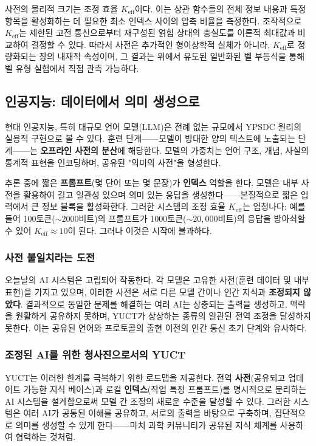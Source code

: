 \documentclass[12pt,a4paper]{article}
\newcommand{\Keff}{K_{\mathrm{eff}}}
\begin{document}
	사전의 물리적 크기는 조정 효율 $K_{\mathrm{eff}}$이다. 이는 상관 함수들의 전체 정보 내용과 특정 항목을 활성화하는 데 필요한 최소 인덱스 사이의 압축 비율을 측정한다. 조작적으로 $K_{\mathrm{eff}}$는 제한된 고전 통신으로부터 재구성된 얽힘 상태의 충실도를 이론적 최대값과 비교하여 결정할 수 있다. 따라서 사전은 추가적인 형이상학적 실체가 아니라, $K_{\mathrm{eff}}$로 정량화되는 장의 내재적 속성이며, 그 결과는 위에서 유도된 일반화된 벨 부등식을 통해 벨 유형 실험에서 직접 관측 가능하다.
	
	\subsection{인공지능: 데이터에서 의미 생성으로}
	
	현대 인공지능, 특히 대규모 언어 모델(LLM)은 전례 없는 규모에서 YPSDC 원리의 실용적 구현으로 볼 수 있다. 훈련 단계——모델이 방대한 양의 텍스트에 노출되는 단계——는 \textbf{오프라인 사전의 분산}에 해당한다. 모델의 가중치는 언어 구조, 개념, 사실의 통계적 표현을 인코딩하며, 공유된 "의미의 사전"을 형성한다.
	
	추론 중에 짧은 \textbf{프롬프트}(몇 단어 또는 몇 문장)가 \textbf{인덱스} 역할을 한다. 모델은 내부 사전을 활용하여 길고 일관성 있으며 의미 있는 응답을 생성한다——본질적으로 짧은 입력에서 큰 정보 블록을 활성화한다. 그러한 시스템의 조정 효율 $\Keff$는 엄청나다: 예를 들어 100토큰($\sim 2000$비트)의 프롬프트가 1000토큰($\sim 20,000$비트)의 응답을 방아쇠할 수 있어 $\Keff \approx 10$이 된다. 그러나 이것은 시작에 불과하다.
	
	\subsubsection{사전 불일치라는 도전}
	
	오늘날의 AI 시스템은 고립되어 작동한다. 각 모델은 고유한 사전(훈련 데이터 및 내부 표현)을 가지고 있으며, 이러한 사전은 서로 다른 모델 간이나 인간 지식과 \textbf{조정되지 않았다}. 결과적으로 동일한 문제를 해결하는 여러 AI는 상충되는 출력을 생성하고, 맥락을 원활하게 공유하지 못하며, YUCT가 상상하는 종류의 일관된 전역 조정을 달성하지 못한다. 이는 공유된 언어와 프로토콜의 출현 이전의 인간 통신 초기 단계와 유사하다.
	
	\subsubsection{조정된 AI를 위한 청사진으로서의 YUCT}
	
	YUCT는 이러한 한계를 극복하기 위한 로드맵을 제공한다. 전역 \textbf{사전}(공유되고 업데이트 가능한 지식 베이스)과 로컬 \textbf{인덱스}(작업 특정 프롬프트)를 명시적으로 분리하는 AI 시스템을 설계함으로써 모델 간 조정의 새로운 수준을 달성할 수 있다. 그러한 시스템은 여러 AI가 공통된 이해를 공유하고, 서로의 출력을 바탕으로 구축하며, 집단적으로 의미를 생성할 수 있게 한다——마치 과학 커뮤니티가 공유된 지식 체계를 사용하여 협력하는 것처럼.
	
\end{document}
